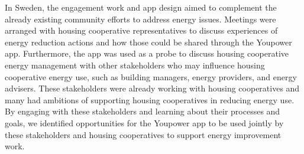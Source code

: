 In Sweden, the engagement work and app design aimed to complement the already existing community efforts to address energy issues. Meetings were arranged with housing cooperative representatives to discuss experiences of energy reduction actions and how those could be shared through the Youpower app. Furthermore, the app was used as a probe to discuss housing cooperative energy management with other stakeholders who may influence housing cooperative energy use, such as building managers, energy providers, and energy advisers. These stakeholders were already working with housing cooperatives and many had ambitions of supporting housing cooperatives in reducing energy use. By engaging with these stakeholders and learning about their processes and goals, we identified opportunities for the Youpower app to be used jointly by these stakeholders and housing cooperatives to support energy improvement work.

